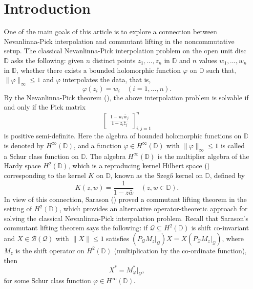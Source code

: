 \documentclass[12pt]{amsart}%
\numberwithin{equation}{section}
\newcommand{\clb}{\mathcal{B}}
\newcommand{\clq}{\mathcal{Q}}
\newcommand{\D}{\mathbb{D}}
\begin{document}
\section{Introduction}
One of the main goals of this article is to explore a connection between Nevanlinna-Pick interpolation and commutant lifting in the noncommutative setup. The classical Nevanlinna-Pick interpolation problem on the open unit disc $\D$ asks the following: given $n$ distinct points $z_1,\ldots,z_n$ in $\D$ and $n$ values $w_1,\ldots,w_n$ in $\D$, whether there exists a bounded holomorphic function $\varphi$ on $\D$ such that, $\|\varphi\|_{\infty}\leq 1$ and $\varphi$ interpolates the data, that is,
\[
\varphi(z_i)=w_i\quad(i=1,\ldots,n).
\]
By the Nevanlinna-Pick theorem (\cite{N, Pick}), the above interpolation problem is solvable if and only if the Pick matrix
\[
\begin{bmatrix}
	\frac{1-w_i\bar w_j}{1-z_i\bar z_j}
\end{bmatrix}_{i,j=1}^n
\]
is positive semi-definite. Here the algebra of bounded holomorphic functions on $\D$ is denoted by $H^{\infty}(\D)$, and a function $\varphi\in H^{\infty}(\D)$ with $\|\varphi\|_{\infty}\leq 1$ is called a Schur class function on $\D$. The algebra $H^{\infty}(\D)$ is the multiplier algebra of the Hardy space $H^2(\D)$, which is a reproducing kernel Hilbert space (\cite{Aron}) corresponding to the kernel $K$ on $\D$, known as the Szeg\H o kernel on $\D$, defined by 
\[
K(z,w)=\frac{1}{1-z\bar w}\quad(z,w\in \D).
\]
In view of this connection, Sarason (\cite{S}) proved a commutant lifting theorem in the setting of $H^2(\D)$, which provides an alternative operator-theoretic approach for solving the classical Nevanlinna-Pick interpolation problem. Recall that Sarason's commutant lifting theorem says the following: if $\clq\subseteq H^2(\D)$ is shift co-invariant and $X\in\clb(\clq)$ with $\|X\|\leq 1$ satisfies $(P_{\clq}M_z|_{\clq})X=X(P_{\clq}M_z|_{\clq})$, where $M_z$ is the shift operator on $H^2(\D)$ (multiplication by the co-ordinate function), then
\[
X^*=M_{\varphi}^*|_{\clq},
\]
for some Schur class function $\varphi\in H^{\infty}(\D)$.
\end{document}
